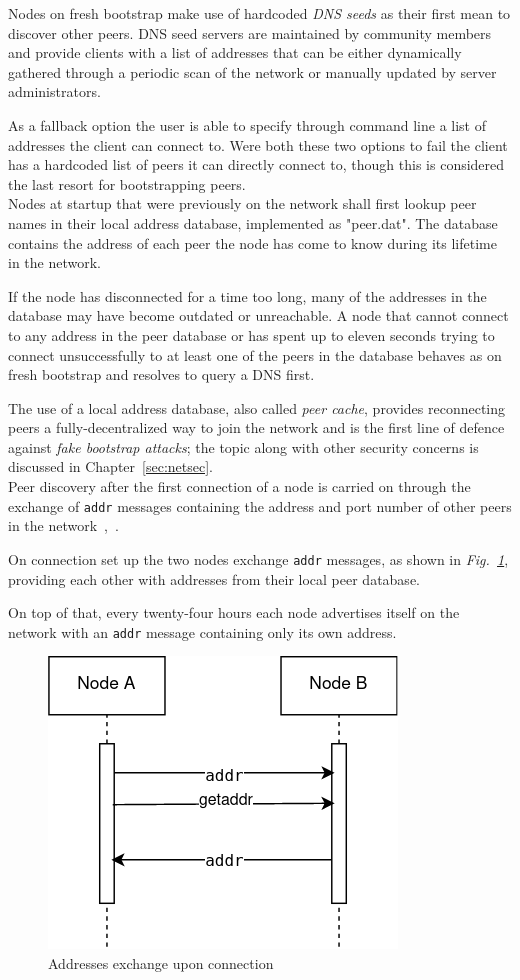\documentclass[12pt, letterpaper, twoside]{article}
\begin{document}
Nodes on fresh bootstrap make use of hardcoded \emph{DNS seeds} as their first mean to discover other peers. DNS seed servers are maintained by community members and provide clients with a list of addresses that can be either dynamically gathered through a periodic scan of the network or manually updated by server administrators.

As a fallback option the user is able to specify through command line a list of addresses the client can connect to. Were both these two options to fail the client has a hardcoded list of peers it can directly connect to, though this is considered the last resort for bootstrapping peers.\\

Nodes at startup that were previously on the network shall first lookup peer names in their local address database, implemented as "peer.dat". The database contains the address of each peer the node has come to know during its lifetime in the network.

If the node has disconnected for a time too long, many of the addresses in the database may have become outdated or unreachable. A node that cannot connect to any address in the peer database or has spent up to eleven seconds trying to connect unsuccessfully to at least one of the peers in the database behaves as on fresh bootstrap and resolves to query a DNS first.

The use of a local address database, also called \emph{peer cache}, provides reconnecting peers a fully-decentralized way to join the network and is the first line of defence against \emph{fake bootstrap attacks}; the topic along with other security concerns is discussed in Chapter~\ref{sec:netsec}.\\

Peer discovery after the first connection of a node is carried on through the exchange of \texttt{addr} messages containing the address and port number of other peers in the network~\cite{protocoldoc},~\cite{devguidep2p}.

On connection set up the two nodes exchange \texttt{addr} messages, as shown in \emph{Fig.~\ref{fig:addr}}, providing each other with addresses from their local peer database.

On top of that, every twenty-four hours each node advertises itself on the network with an \texttt{addr} message containing only its own address.

\begin{figure}[h]
	\includegraphics[width=.45\textwidth]{pict/BTCaddr.png}
	\centering
	\caption{Addresses exchange upon connection}
	\label{fig:addr}
\end{figure}
\end{document}
